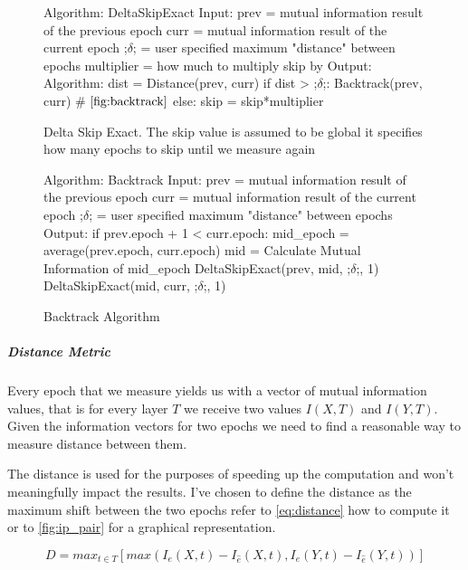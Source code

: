   

\begin{figure}[H]
    \begin{pythonfigure}
      Algorithm: DeltaSkipExact
      Input:
      prev = mutual information result of the previous epoch
      curr = mutual information result of the current epoch
      ;$\delta$; = user specified maximum "distance" between epochs
      multiplier = how much to multiply skip by
      Output:
      Algorithm:
      dist = Distance(prev, curr)
      if dist > ;$\delta$;:
        Backtrack(prev, curr) # $\autoref{fig:backtrack}$
      else:
        skip = skip*multiplier
    \end{pythonfigure}
    \caption{Delta Skip Exact. The skip value is assumed to be global it
    specifies how many epochs to skip until we measure again}
    \label{fig:deltaexact}
\end{figure}

\begin{figure}[H]
    \begin{pythonfigure}
      Algorithm: Backtrack
      Input:
      prev = mutual information result of the previous epoch
      curr = mutual information result of the current epoch
      ;$\delta$; = user specified maximum "distance" between epochs
      Output:
      if prev.epoch + 1 < curr.epoch:
        mid_epoch = average(prev.epoch, curr.epoch)
        mid = Calculate Mutual Information of mid_epoch
        DeltaSkipExact(prev, mid, ;$\delta$;, 1)
        DeltaSkipExact(mid, curr, ;$\delta$;, 1)
    \end{pythonfigure}
    \caption{Backtrack Algorithm}
    \label{fig:backtrack}
\end{figure}


  \subparagraph{Distance Metric}
  Every epoch that we measure yields us with a vector of mutual information
  values, that is for every layer $T$ we receive two values $I(X,T)$ and
  $I(Y,T)$. Given the information vectors for two epochs we need to find a
  reasonable way to measure distance between them.

  The distance is used for the purposes of speeding up the computation and won't
  meaningfully impact the results. I've chosen to define the distance as the
  maximum shift between the two epochs refer to \autoref{eq:distance} how to
  compute it or to \autoref{fig:ip_pair} for a graphical representation.

  \begin{equation}
    D = max_{t\in T} [max( I_e(X, t) - I_{\hat{e}}(X, t), I_e(Y, t) - I_{\hat{e}}(Y, t))]
    \label{eq:distance}
  \end{equation} 

